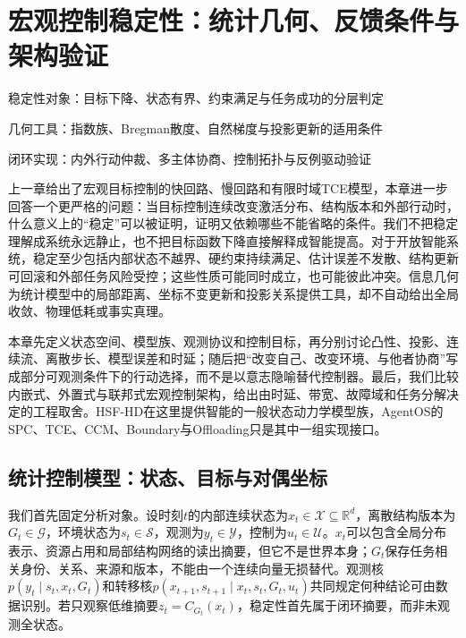 \chapter{宏观控制稳定性：统计几何、反馈条件与架构验证}
\label{chp:macro_stability_ig}

\begin{introduction}
\item 稳定性对象：目标下降、状态有界、约束满足与任务成功的分层判定
\item 几何工具：指数族、Bregman散度、自然梯度与投影更新的适用条件
\item 闭环实现：内外行动仲裁、多主体协商、控制拓扑与反例驱动验证
\end{introduction}

上一章给出了宏观目标控制的快回路、慢回路和有限时域TCE模型，本章进一步回答一个更严格的问题：当目标控制连续改变激活分布、结构版本和外部行动时，什么意义上的“稳定”可以被证明，证明又依赖哪些不能省略的条件。我们不把稳定理解成系统永远静止，也不把目标函数下降直接解释成智能提高。对于开放智能系统，稳定至少包括内部状态不越界、硬约束持续满足、估计误差不发散、结构更新可回滚和外部任务风险受控；这些性质可能同时成立，也可能彼此冲突。信息几何为统计模型中的局部距离、坐标不变更新和投影关系提供工具，却不自动给出全局收敛、物理低耗或事实真理。

本章先定义状态空间、模型族、观测协议和控制目标，再分别讨论凸性、投影、连续流、离散步长、模型误差和时延；随后把“改变自己、改变环境、与他者协商”写成部分可观测条件下的行动选择，而不是以意志隐喻替代控制器。最后，我们比较内嵌式、外置式与联邦式宏观控制架构，给出由时延、带宽、故障域和任务分解决定的工程取舍。HSF-HD在这里提供智能的一般状态动力学模型族，AgentOS的SPC、TCE、CCM、Boundary与Offloading只是其中一组实现接口。

\section{统计控制模型：状态、目标与对偶坐标}
\label{sec:section_5895}

我们首先固定分析对象。设时刻$t$的内部连续状态为$x_t\in\mathcal X\subseteq\mathbb R^d$，离散结构版本为$G_t\in\mathcal G$，环境状态为$s_t\in\mathcal S$，观测为$y_t\in\mathcal Y$，控制为$u_t\in\mathcal U$。$x_t$可以包含全局分布表示、资源占用和局部结构网络的读出摘要，但它不是世界本身；$G_t$保存任务相关身份、关系、来源和版本，不能由一个连续向量无损替代。观测核$p(y_t\mid s_t,x_t,G_t)$和转移核$p(x_{t+1},s_{t+1}\mid x_t,s_t,G_t,u_t)$共同规定何种结论可由数据识别。若只观察低维摘要$z_t=C_{G_t}(x_t)$，稳定性首先属于闭环摘要，而非未观测全状态。

